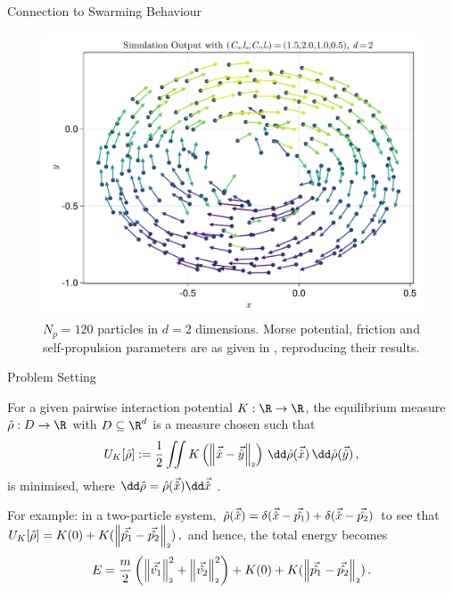 \documentclass[aspectratio=169, hyperref={colorlinks=true}]{beamer}
\begin{document}
  \begin{frame}{Connection to Swarming Behaviour}
    \begin{figure}[H]
      \centering
      \includegraphics[width=0.56\linewidth]{results/morse-2d/simulation-quiver.pdf}
      \caption[Quiver plot of 120 particles in 2D interacting through the Morse potential]{$N_p = 120$ particles in $d = 2$ dimensions. Morse potential, friction and self-propulsion parameters are as given in \cite{2006-self-propelled}, reproducing their results.}
      \label{fig:simulation-quiver-illustration}
    \end{figure}
  \end{frame}

  \begin{frame}{Problem Setting}
    \begin{definition}
      For a given pairwise interaction potential $K: \R \to \R$, the equilibrium measure $\hat{\rho}: D \to \R$ with $D \subseteq \R^d$ is a measure chosen such that
      $$U_K[\hat{\rho}] := \frac{1}{2} \iint K\left(\norm{\hatvec{x} - \hatvec{y}}\right) \,\dd\hat{\rho}(\hatvec{x})\,\dd\hat{\rho}(\hatvec{y})\,,$$
      is minimised, where $\dd\hat{\rho} = \hat{\rho}(\hatvec{x})\dd\hatvec{x}$ \parencite{2021-arbitrary-dimensions}.
    \end{definition}
    \pause

    For example: in a two-particle system, $\hat{\rho}(\vec{\hat{x}}) = \delta(\vec{\hat{x}}-\vec{\hat{p_1}}) + \delta(\vec{\hat{x}}-\vec{\hat{p_2}})$ to see that
    $U_K[\hat{\rho}] = K(0) + K(\left\lVert\vec{\hat{p_1}} - \vec{\hat{p_2}}\right\rVert_{\scriptscriptstyle 2})\,,$
    and hence, the total energy becomes
    $$E = \frac{m}{2} \left(\left\lVert\vec{\hat{v_1}}\right\rVert_{\scriptscriptstyle 2}^2 + \left\lVert\vec{\hat{v_2}}\right\rVert_{\scriptscriptstyle 2}^2\right) + K(0) + K(\left\lVert\vec{\hat{p_1}} - \vec{\hat{p_2}}\right\rVert_{\scriptscriptstyle 2})\,.$$
  \end{frame}
\end{document}
